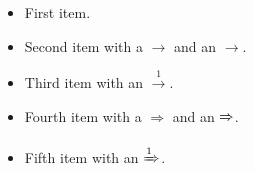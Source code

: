 \documentclass{article}
\begin{document}
\begin{itemize}
    \item First item.
    \item Second item with a $\rightarrow$ and an $\xrightarrow{}$.
    \item Third item with an $\xrightarrow{1}$.
    \item Fourth item with a $\Rightarrow$ and an $\xRightarrow{}$.
    \item Fifth item with an $\xRightarrow{1}$.
\end{itemize}
\end{document}
